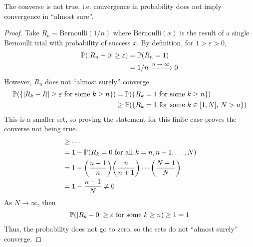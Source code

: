 \begin{lemma}
    The converse is not true, i.e. convergence in probability does not imply convergence in ``almost sure''.
\end{lemma}
\begin{proof}
    Take $R_n \sim \text{Bernoulli}(1/n)$ where $\text{Bernoulli}(x)$ is the result of a single Bernoulli trial with probability of success $x$. By definition, for $1 > \varepsilon > 0$,
    \begin{align}
        \probability(\abs{R_n - 0} \ge \varepsilon)
        &= \probability(R_n = 1)\\
        &= 1/n \ce{->[$n \to \infty$]} 0
    \end{align}
    However, $R_n$ does not ``almost surely'' converge.
    \begin{align}
        \mathbb{P}(\{ \abs{R_k - R} \ge \varepsilon \text{ for some $k \ge n$} \})
        &= \mathbb{P}(\{R_k = 1 \text{ for some $k \ge n$}\})\\
        &\ge \mathbb{P}(\{ R_k = 1 \text{ for some $k \in [1,N]$, $N > n$} \})
    \end{align}
    This is a smaller set, so proving the statement for this finite case proves the converse not being true.
    \begin{align}
        &\ge \cdots\\
        &= 1 - \mathbb{P}(R_k = 0 \text{ for all } k = n, n+1, \ldots, N)\\
        &= 1 - \qty(\frac{n-1}{n})\qty(\frac{n}{n+1})\cdots\qty(\frac{N-1}{N})\\
        &= 1 - \frac{n-1}{N} \ne 0
    \end{align}
    As $N \to \infty$, then
    \begin{align}
        \mathbb{P}(\abs{R_k - 0} \ge \varepsilon \text{ for some $k \ge n$}) \ge 1 = 1
    \end{align}
    Thus, the probability does not go to zero, so the sets do not ``almost surely'' converge.
\end{proof}

